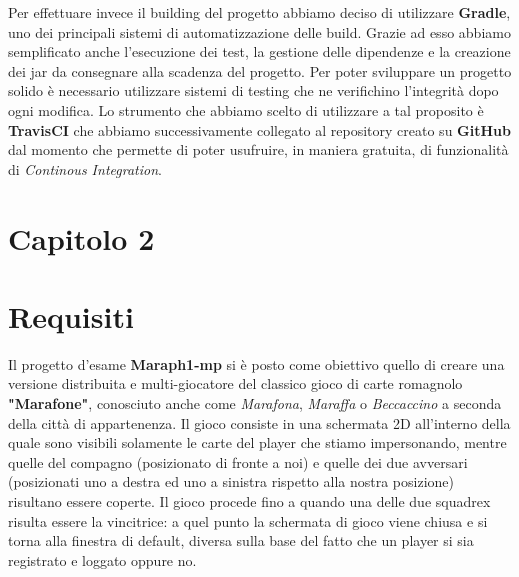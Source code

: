 Per effettuare invece il building del progetto abbiamo deciso di utilizzare \textbf{Gradle}, uno dei principali sistemi di automatizzazione delle build. Grazie ad esso abbiamo semplificato anche l'esecuzione dei test, la gestione delle dipendenze e la creazione dei jar da consegnare alla scadenza del progetto. Per poter sviluppare un progetto solido è necessario utilizzare sistemi di testing che ne verifichino l'integrità dopo ogni modifica. Lo strumento che abbiamo scelto di utilizzare a tal proposito è \textbf{TravisCI} che abbiamo successivamente collegato al repository creato su \textbf{GitHub} dal momento che permette di poter usufruire, in maniera gratuita, di funzionalità di \textit{Continous Integration}. 
        
        
        
        
        \clearpage
        
    \section*{\Huge {\textbf Capitolo 2}\label{chapter2}}
    \section{Requisiti}\label{sec:requirements}
    Il progetto d'esame \textbf{Maraph1-mp} si è posto come obiettivo quello di creare una versione distribuita e multi-giocatore del classico gioco di carte romagnolo \textbf{"Marafone"}, conosciuto anche come \textit{Marafona}, \textit{Maraffa} o \textit{Beccaccino} a seconda della città di appartenenza. Il gioco consiste in una schermata 2D all'interno della quale sono visibili solamente le carte del player che stiamo impersonando, mentre quelle del compagno (posizionato di fronte a noi) e quelle dei due avversari (posizionati uno a destra ed uno a sinistra rispetto alla nostra posizione) risultano essere coperte. Il gioco procede fino a quando una delle due squadrex risulta essere la vincitrice: a quel punto la schermata di gioco viene chiusa e si torna alla finestra di default, diversa sulla base del fatto che un player si sia registrato e loggato oppure no.
    
